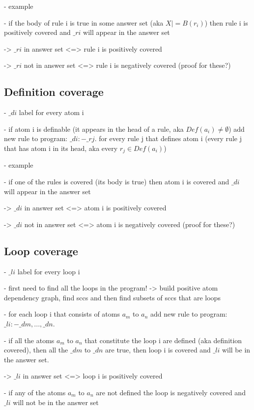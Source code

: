 - example

- if the body of rule i is true in some answer set (aka $X |= B(r_i)$) then rule i is positively covered and $\_ri$ will appear in the answer set 

-> $\_ri$ in answer set <=> rule i is positively covered

-> $\_ri$ not in answer set <=> rule i is negatively covered (proof for these?)

\subsection{Definition coverage}
\label{subsec:Computing coverage metrics for propositional programs/General approach/Definition coverage}
- $\_di$ label for every atom i

- if atom i is definable (it appears in the head of a rule, aka $Def(a_i)\neq\emptyset$) add new rule to program: $\_di :- \_rj$. for every rule j that defines atom i 
(every rule j that has atom i in its head, aka every $r_j \in Def(a_i)$)

- example

- if one of the rules is covered (its body is true) then atom i is covered and $\_di$ will appear in the answer set

-> $\_di$ in answer set <=> atom i is positively covered

-> $\_di$ not in answer set <=> atom i is negatively covered (proof for these?)

\subsection{Loop coverage}
\label{subsec:Computing coverage metrics for propositional programs/General approach/Loop coverage}
- $\_li$ label for every loop i

- first need to find all the loops in the program! -> build positive atom dependency graph, find sccs and then find subsets of sccs 
that are loops

- for each loop i that consists of atoms $a_m$ to $a_n$ add new rule to program: $\_li :- \_dm, ..., \_dn$.

- if all the atoms $a_m$ to $a_n$ that constitute the loop i are defined (aka definition covered), then all the $\_dm$ to $\_dn$ are true, 
then loop i is covered and $\_li$ will be in the answer set.

-> $\_li$ in answer set <=> loop i is positively covered

- if any of the atoms $a_m$ to $a_n$ are not defined the loop is negatively covered and  $\_li$ will not be in the answer set

